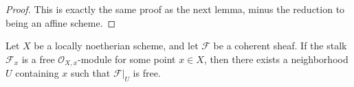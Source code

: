 \begin{proof}
	This is exactly the same proof
	as the next lemma, minus the reduction
	to being an affine scheme.
\end{proof}


\begin{theorem}
	\label{thm:stalk_free_implies_locally_free}

	Let \(X\) be a locally noetherian scheme, and let
	\(\mathcal{F}\) be a coherent sheaf. 
	If the stalk \(\mathcal{F}_{x}\) is a free
	\(\mathcal{O}_{X,x} \)-module for some point
	\(x \in X\), then there exists
	a neighborhood \(U\) containing \(x\) such that
	\(\mathcal{F}|_{U}\) is free.
\end{theorem}

